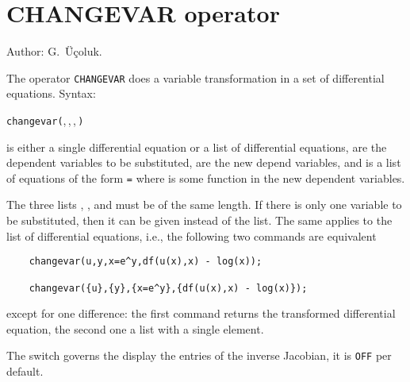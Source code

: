 \section{CHANGEVAR operator}
\hypertarget{operator:CHANGEVAR}{}

\noindent
Author: G.~\"{U}\c{c}oluk.

The operator \texttt{CHANGEVAR} does a variable transformation in a set of
differential equations.
Syntax:
\begin{syntaxtable}
  \texttt{changevar(},\,,\,,\,\texttt{)}
\end{syntaxtable}
 is either a single differential equation or a list of
differential equations,  are the dependent variables to
be substituted,  are the new depend variables, and
 is a list of equations of the form 
\texttt{=}  where  is some function
in the new dependent variables.

The three lists , , and  must
be of the same length. If there is only one variable to be
substituted, then it can be given instead of the list. The same applies to the list
of differential equations, i.e., the following two
commands are equivalent
\begin{verbatim}
    changevar(u,y,x=e^y,df(u(x),x) - log(x));

    changevar({u},{y},{x=e^y},{df(u(x),x) - log(x)});
\end{verbatim}
except for one difference: the first command returns the transformed differential
equation, the second one a list with a single element.

\hypertarget{switch:DISPJACOBIAN}{}
The switch  governs the display the entries of the inverse Jacobian,
it is \texttt{OFF} per default.

